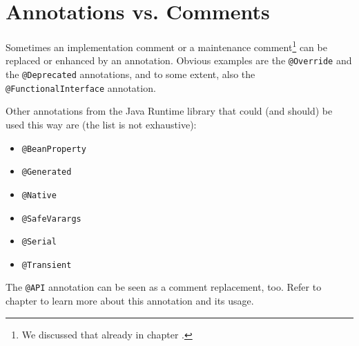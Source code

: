 \chapter{Annotations vs. Comments}\label{sec:CommentVsAnnotations}
Sometimes an implementation comment or a maintenance comment\footnote{We discussed that already in chapter .} can be replaced or enhanced by an annotation. Obvious examples are the
\lstinline|@Override| \autocite{ORACLE_DOC_OVERRIDE_ANNOTATION} and the \lstinline|@Deprecated| \autocite{ORACLE_DOC_DEPRECATED_ANNOTATION} annotations, and to some extent, also the \lstinline|@FunctionalInterface| \autocite{ORACLE_DOC_FUNCTIONALINTERFACE_ANNOTATION} annotation.

Other annotations from the Java Runtime library that could (and should) be used this way are (the list is not exhaustive):
\begin{itemize}[nosep]
	\item{\lstinline|@BeanProperty| \autocite{ORACLE_DOC_BEANPROPERTY_ANNOTATION}}
	
	\item{\lstinline|@Generated| \autocite{ORACLE_DOC_GENERATED_ANNOTATION}}
	
	\item{\lstinline|@Native| \autocite{ORACLE_DOC_NATIVE_ANNOTATION}}
	
	\item{\lstinline|@SafeVarargs| \autocite{ORACLE_DOC_SAFEVARARGS_ANNOTATION}}
	
	\item{\lstinline|@Serial| \autocite{ORACLE_DOC_SERIAL_ANNOTATION}}
	
	\item{\lstinline|@Transient| \autocite{ORACLE_DOC_TRANSIENT_ANNOTATION}}
\end{itemize}

The \lstinline|@API| \autocite{APIGUARDIAN:API} annotation can be seen as a comment replacement, too. Refer to chapter  to learn more about this annotation and its usage.


